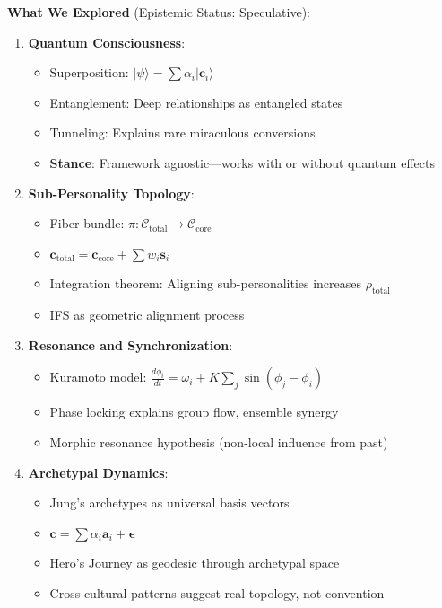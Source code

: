 \documentclass[11pt,a4paper]{article}
\theoremstyle{definition}
\theoremstyle{remark}
\newcommand{\CC}{\mathcal{C}}
\newcommand{\cc}{\mathbf{c}}
\begin{document}
\begin{enumerate}
\begin{mdframed}[backgroundcolor=green!10,linewidth=2pt,linecolor=green!70!black]
\textbf{What We Explored} (Epistemic Status: Speculative):

\begin{enumerate}[nosep]
    \item \textbf{Quantum Consciousness}:
        \begin{itemize}[nosep]
            \item Superposition: \(|\psi\rangle = \sum \alpha_i|\cc_i\rangle\)
            \item Entanglement: Deep relationships as entangled states
            \item Tunneling: Explains rare miraculous conversions
            \item \textbf{Stance}: Framework agnostic—works with or without quantum effects
        \end{itemize}
    
    \item \textbf{Sub-Personality Topology}:
        \begin{itemize}[nosep]
            \item Fiber bundle: \(\pi: \CC_{\text{total}} \to \CC_{\text{core}}\)
            \item \(\cc_{\text{total}} = \cc_{\text{core}} + \sum w_i \mathbf{s}_i\)
            \item Integration theorem: Aligning sub-personalities increases \(\rho_{\text{total}}\)
            \item IFS as geometric alignment process
        \end{itemize}
    
    \item \textbf{Resonance and Synchronization}:
        \begin{itemize}[nosep]
            \item Kuramoto model: \(\frac{d\phi_i}{dt} = \omega_i + K\sum_j \sin(\phi_j - \phi_i)\)
            \item Phase locking explains group flow, ensemble synergy
            \item Morphic resonance hypothesis (non-local influence from past)
        \end{itemize}
    
    \item \textbf{Archetypal Dynamics}:
        \begin{itemize}[nosep]
            \item Jung's archetypes as universal basis vectors
            \item \(\cc = \sum \alpha_i \mathbf{a}_i + \boldsymbol{\epsilon}\)
            \item Hero's Journey as geodesic through archetypal space
            \item Cross-cultural patterns suggest real topology, not convention
        \end{itemize}
\end{enumerate}


\end{mdframed}
\end{enumerate}
\end{document}
